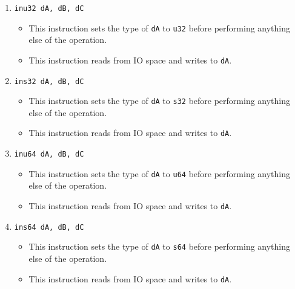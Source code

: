 \documentclass{article}
\begin{document}
\begin{itemize}
\begin{enumerate}
			\item \texttt{inu32 dA, dB, dC}
				\begin{itemize}
				\item This instruction sets the type of \texttt{dA} to
					\texttt{u32} before performing anything else of the
					operation.
				\item This instruction reads from IO space and writes to
					\texttt{dA}.
				\end{itemize}
			\item \texttt{ins32 dA, dB, dC}
				\begin{itemize}
				\item This instruction sets the type of \texttt{dA} to
					\texttt{s32} before performing anything else of the
					operation.
				\item This instruction reads from IO space and writes to
					\texttt{dA}.
				\end{itemize}
			\item \texttt{inu64 dA, dB, dC}
				\begin{itemize}
				\item This instruction sets the type of \texttt{dA} to
					\texttt{u64} before performing anything else of the
					operation.
				\item This instruction reads from IO space and writes to
					\texttt{dA}.
				\end{itemize}
			\item \texttt{ins64 dA, dB, dC}
				\begin{itemize}
				\item This instruction sets the type of \texttt{dA} to
					\texttt{s64} before performing anything else of the
					operation.
				\item This instruction reads from IO space and writes to
					\texttt{dA}.
				\end{itemize}


\end{enumerate}
\end{itemize}
\end{document}
